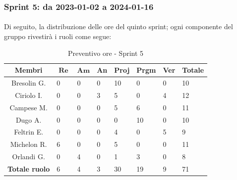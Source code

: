 \documentclass[10pt, a4paper]{article}
\begin{document}
{{{{{{{{{{{{%


\subsubsection{Sprint 5: da 2023-01-02 a 2024-01-16}
\paragraph{}Di seguito, la distribuzione delle ore del quinto sprint; ogni componente del gruppo rivestirà i ruoli come segue:
\begin{table}[H]
\begin{tabularx}{\textwidth}{c|X|X|X|X|X|X|X}
        \textbf{Membri} & $\operatorname{\textbf{Re}}$ & $\mathrm{\textbf{Am}}$ & \textbf{An} & \textbf{Proj} & \textbf{Prgm} & \textbf{Ver} & \textbf{Totale} \\
        \hline Bresolin G. & 0 & 0 & 0 & \cellcolor{primarycolor}10 & 0 & 0 & 10 \\
        \hline Ciriolo I.  & 0 & 0 & 3 & \cellcolor{primarycolor}5 & 0 & 4 & 12 \\
        \hline Campese M.  & 0 & 0 & 0 & \cellcolor{primarycolor}5 & 6 & 0 & 11 \\
        \hline Dugo A.     & 0 & 0 & 0 & 0 & \cellcolor{primarycolor}10 & 0 & 10 \\
        \hline Feltrin E.  & 0 & 0 & 0 & 4 & 0 & \cellcolor{primarycolor}5 & 9 \\
        \hline Michelon R. & \cellcolor{primarycolor}6 & 0 & 0 & 5 & 0 & 0 & 11 \\
        \hline Orlandi G.  & 0 & \cellcolor{primarycolor}4 & 0 & 1 & 3 & 0 & 8 \\
        \hline
        \textbf{Totale ruolo} & 6 & 4 & 3 & 30 & 19 & 9 & 71 
    \end{tabularx}
    \caption{Preventivo ore - Sprint 5}
    \end{table}

}}}}}}}}}}}}
\end{document}
